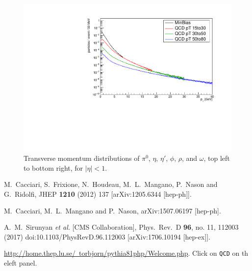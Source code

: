 \documentclass[12pt]{article}
\begin{document}
\begin{figure}
  \includegraphics[width=0.48\linewidth]{plots/h_omega.pdf}
  \caption{\protect Transverse momentum distributions of 
$\pi^0$, $\eta$, $\eta'$, $\phi$, $\rho$, and $\omega$, top left
to bottom right, for $|\eta| < 1$.}
\label{fig:mesons}
\end{figure}



\begin{thebibliography}{1}

  M.~Cacciari, S.~Frixione, N.~Houdeau, M.~L.~Mangano, P.~Nason and G.~Ridolfi,
  JHEP {\bf 1210} (2012) 137 [arXiv:1205.6344 [hep-ph]].

  M.~Cacciari, M.~L.~Mangano and P.~Nason,
  arXiv:1507.06197 [hep-ph].

  A.~M.~Sirunyan {\it et al.} [CMS Collaboration],
  Phys.\ Rev.\ D {\bf 96}, no. 11, 112003 (2017)
  doi:10.1103/PhysRevD.96.112003
  [arXiv:1706.10194 [hep-ex]].

\href{http://home.thep.lu.se/~torbjorn/pythia81php/Welcome.php}
{http://home.thep.lu.se/~torbjorn/pythia81php/Welcome.php}.  Click on 
{\tt QCD} on th eleft panel.

\end{thebibliography}  
\end{document}
